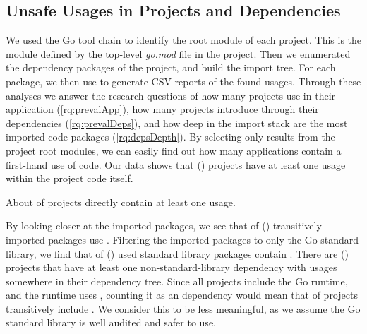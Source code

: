 \subsection{Unsafe Usages in Projects and Dependencies}

We used the Go tool chain to identify the root module of each project. 
This is the module defined by the top-level \textit{go.mod} file in the project.
Then we enumerated the dependency packages of the project, and build the import tree.
For each package, we then use \toolUsage{} to generate CSV reports of the found \unsafe{} usages.
Through these analyses we answer the research questions of how many projects use \unsafe{} in their application (\ref{rq:prevalApp}), how many projects introduce \unsafe{} through their dependencies (\ref{rq:prevalDeps}), and how deep in the import stack are the most imported \unsafe{} code packages (\ref{rq:depsDepth}). 
By selecting only results from the project root modules, we can easily find out how many applications contain a first-hand use of \unsafe{} code.
Our data shows that  () projects have at least one \unsafe{} usage within the project code itself.

\begin{tcolorbox}[boxsep=1pt, enlarge top by=5pt, title=Answer to \ref{rq:prevalApp}]
About  of projects directly contain at least one \unsafe{} usage.
\end{tcolorbox}


By looking closer at the imported packages, we see that  of  () transitively imported packages use \unsafe{}. 
Filtering the imported packages to only the Go standard library, we find that  of  () used standard library packages contain \unsafe{}.
There are  () projects that have at least one non-standard-library dependency with \unsafe{} usages somewhere in their dependency tree.
Since all projects include the Go runtime, and the runtime uses \unsafe{}, counting it as an \unsafe{} dependency would mean that  of projects transitively include \unsafe{}.
We consider this to be less meaningful, as we assume the Go standard library is well audited and safer to use.

